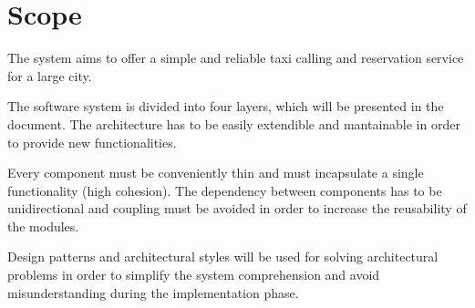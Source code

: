 \section{Scope}
\label{sec:scope}

The system aims to offer a simple and reliable taxi calling and reservation service for a large city.

The software system is divided into four layers, which will be presented in the document. The architecture has to be easily extendible and mantainable in order to provide new functionalities.

 Every component must be conveniently thin and must incapsulate a single functionality (high cohesion).
 The dependency between components has to be unidirectional and coupling must be avoided in order to increase the reusability of the modules.

 Design patterns and architectural styles will be used for solving architectural problems in order to simplify the system comprehension and avoid misunderstanding during the implementation phase.
